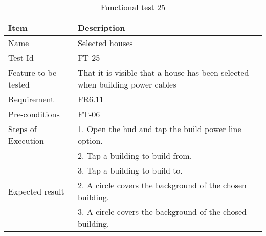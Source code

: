 \begin{table}[H]
\centering
	\begin{tabular}{ l | p{8cm} }
		\hline
		{\bf Item} & {\bf Description} \\ \hline
		Name & Selected houses \\ 
		Test Id & FT-25 \\ 
		Feature to be tested & That it is visible that a house has been selected when building power cables \\ 
		Requirement & FR6.11 \\ 
		Pre-conditions & FT-06 \\ 
		Steps of Execution & 1. Open the hud and tap the build power line option. \\
		& 2. Tap a building to build from. \\
		& 3. Tap a building to build to. \\
		Expected result & 2. A circle covers the background of the chosen building. \\
		& 3. A circle covers the background of the chosed building. \\
	\end{tabular}
	\caption{Functional test 25}
\end{table}

